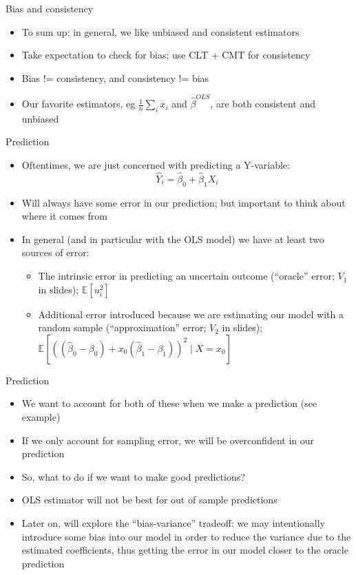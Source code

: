 \documentclass[aspectratio=169]{beamer}
\begin{document}
\begin{frame}{Bias and consistency}
    \begin{itemize}
        \item To sum up: in general, we like unbiased and consistent estimators
        \item Take expectation to check for bias; use CLT + CMT for consistency
        \item Bias != consistency, and consistency != bias
        \item Our favorite estimators, eg $\frac{1}{n} \sum_i x_i $ and $\hat{\beta}^{OLS}$, are both consistent and unbiased
    \end{itemize}
\end{frame}

\begin{frame}{Prediction}
    \begin{itemize}
        \item Oftentimes, we are just concerned with predicting a Y-variable:
        $$
            \hat{Y}_i = \hat{\beta}_0 + \hat{\beta}_1 X_i
        $$
        \item Will always have some error in our prediction; but important to think about where it comes from
        \item In general (and in particular with the OLS model) we have at least two sources of error:
        \begin{itemize}
            \item The intrinsic error in predicting an uncertain outcome (``oracle'' error; $V_1$ in slides); $\mathbb{E}[u_i^2]$
            \item Additional error introduced because we are estimating our model with a random sample (``approximation'' error; $V_2$ in slides); $\mathbb{E}\left[\left(\left(\hat{\beta}_0-\beta_0\right)+x_0\left(\hat{\beta}_1-\beta_1\right)\right)^2 \mid X=x_0\right]$
        \end{itemize}
    \end{itemize}
\end{frame}

\begin{frame}{Prediction}
    \begin{itemize}
        \item We want to account for both of these when we make a prediction (see example)
        \item If we only account for sampling error, we will be overconfident in our prediction 
        \item So, what to do if we want to make good predictions?
        \item OLS estimator will not be best for out of sample predictions
        \item Later on, will explore the ``bias-variance'' tradeoff: we may intentionally introduce some bias into our model in order to reduce the variance due to the estimated coefficients, thus getting the error in our model closer to the oracle prediction
    \end{itemize}
\end{frame}
\end{document}
